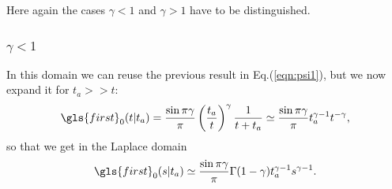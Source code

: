 Here again the cases $\gamma<1$ and $\gamma >1$ have to be distinguished. 

\subsubsection{$\gamma<1$}
In this domain we can reuse the previous result in Eq.(\ref{eqn:psi1}), but we now expand it for $t_a>>t$:
\begin{equation}
 \gls{first}_0(t|t_a) = \frac{\sin \pi \gamma}{\pi} \left( \frac{t_a}{t}\right)^\gamma \frac{1}{t+t_a} 
  \simeq  \frac{\sin \pi \gamma}{\pi} t_a^{\gamma-1} t^{-\gamma},
\end{equation}
so that we get in the Laplace domain 
\begin{equation}
 \gls{first}_0(s|t_a) \simeq \frac{\sin \pi \gamma}{\pi} \Gamma(1-\gamma) t_a^{\gamma-1} s^{\gamma-1}.
\end{equation}

